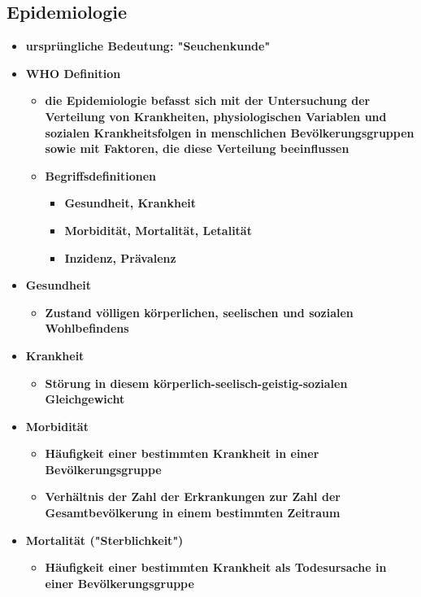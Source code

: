\subsection{Epidemiologie}
	\begin{itemize}
		\item \textbf{ursprüngliche Bedeutung: "Seuchenkunde"}
		\item \textbf{WHO Definition}
			\begin{itemize}
				\item \textbf{die Epidemiologie befasst sich mit der Untersuchung der Verteilung von Krankheiten, physiologischen Variablen und sozialen Krankheitsfolgen in menschlichen Bevölkerungsgruppen sowie mit Faktoren, die diese Verteilung beeinflussen}
				\item \textbf{Begriffsdefinitionen}
					\begin{itemize}
						\item \textbf{Gesundheit, Krankheit}
						\item \textbf{Morbidität, Mortalität, Letalität}
						\item \textbf{Inzidenz, Prävalenz}
					\end{itemize}
			\end{itemize}
		\item \textbf{Gesundheit}
			\begin{itemize}
				\item \textbf{Zustand völligen körperlichen, seelischen und sozialen Wohlbefindens}
			\end{itemize}
		\item \textbf{Krankheit}
			\begin{itemize}
				\item \textbf{Störung in diesem körperlich-seelisch-geistig-sozialen Gleichgewicht}
			\end{itemize}
		\item \textbf{Morbidität}
			\begin{itemize}
				\item \textbf{Häufigkeit einer bestimmten Krankheit in einer Bevölkerungsgruppe}
				\item \textbf{Verhältnis der Zahl der Erkrankungen zur Zahl der Gesamtbevölkerung in einem bestimmten Zeitraum}
			\end{itemize}
		\item \textbf{Mortalität ("Sterblichkeit")}
			\begin{itemize}
				\item \textbf{Häufigkeit einer bestimmten Krankheit als Todesursache in einer Bevölkerungsgruppe}

\end{itemize}
\end{itemize}
